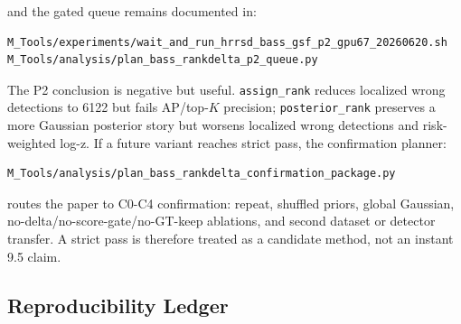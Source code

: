 \documentclass[10pt]{article}
\begin{document}
and the gated queue remains documented in:
\begin{verbatim}
M_Tools/experiments/wait_and_run_hrrsd_bass_gsf_p2_gpu67_20260620.sh
M_Tools/analysis/plan_bass_rankdelta_p2_queue.py
\end{verbatim}
The P2 conclusion is negative but useful.  \texttt{assign\_rank} reduces
localized wrong detections to 6122 but fails AP/top-$K$ precision; 
\texttt{posterior\_rank} preserves a more Gaussian posterior story but worsens
localized wrong detections and risk-weighted log-z.  If a future variant reaches
strict pass, the confirmation planner:
\begin{verbatim}
M_Tools/analysis/plan_bass_rankdelta_confirmation_package.py
\end{verbatim}
routes the paper to C0-C4 confirmation: repeat, shuffled priors, global
Gaussian, no-delta/no-score-gate/no-GT-keep ablations, and second dataset or
detector transfer.  A strict pass is therefore treated as a candidate method,
not an instant 9.5 claim.

\subsection{Reproducibility Ledger}
\end{document}
